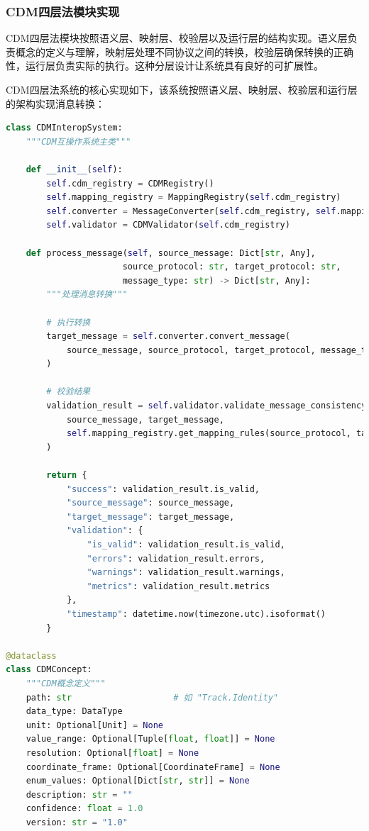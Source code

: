 \subsubsection{CDM四层法模块实现}

CDM四层法模块按照语义层、映射层、校验层以及运行层的结构实现。语义层负责概念的定义与理解，映射层处理不同协议之间的转换，校验层确保转换的正确性，运行层负责实际的执行。这种分层设计让系统具有良好的可扩展性。

CDM四层法系统的核心实现如下，该系统按照语义层、映射层、校验层和运行层的架构实现消息转换：

\begin{lstlisting}[language=Python, label=fig:cdm_system]
class CDMInteropSystem:
    """CDM互操作系统主类"""
    
    def __init__(self):
        self.cdm_registry = CDMRegistry()
        self.mapping_registry = MappingRegistry(self.cdm_registry)
        self.converter = MessageConverter(self.cdm_registry, self.mapping_registry)
        self.validator = CDMValidator(self.cdm_registry)
    
    def process_message(self, source_message: Dict[str, Any], 
                       source_protocol: str, target_protocol: str,
                       message_type: str) -> Dict[str, Any]:
        """处理消息转换"""
        
        # 执行转换
        target_message = self.converter.convert_message(
            source_message, source_protocol, target_protocol, message_type
        )
        
        # 校验结果
        validation_result = self.validator.validate_message_consistency(
            source_message, target_message, 
            self.mapping_registry.get_mapping_rules(source_protocol, target_protocol, message_type)
        )
        
        return {
            "success": validation_result.is_valid,
            "source_message": source_message,
            "target_message": target_message,
            "validation": {
                "is_valid": validation_result.is_valid,
                "errors": validation_result.errors,
                "warnings": validation_result.warnings,
                "metrics": validation_result.metrics
            },
            "timestamp": datetime.now(timezone.utc).isoformat()
        }

@dataclass
class CDMConcept:
    """CDM概念定义"""
    path: str                    # 如 "Track.Identity"
    data_type: DataType
    unit: Optional[Unit] = None
    value_range: Optional[Tuple[float, float]] = None
    resolution: Optional[float] = None
    coordinate_frame: Optional[CoordinateFrame] = None
    enum_values: Optional[Dict[str, str]] = None
    description: str = ""
    confidence: float = 1.0
    version: str = "1.0"
\end{lstlisting}

